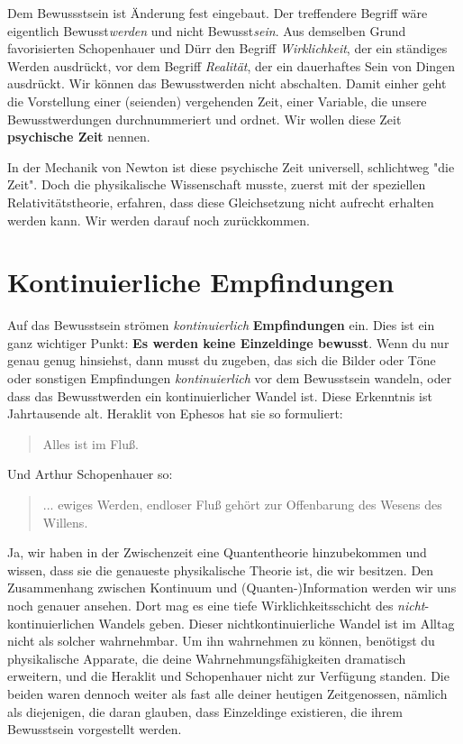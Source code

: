 \documentclass[12pt]{book}
\begin{document}
Dem Bewussstsein ist Änderung fest eingebaut. Der treffendere Begriff wäre eigentlich Bewusst\emph{werden} und nicht Bewusst\emph{sein}. Aus demselben Grund favorisierten Schopenhauer und Dürr den Begriff \emph{Wirklichkeit}, der ein ständiges Werden ausdrückt, vor dem Begriff \emph{Realität}, der ein dauerhaftes Sein von Dingen ausdrückt. Wir können das Bewusstwerden nicht abschalten. Damit einher geht die Vorstellung einer (seienden) vergehenden Zeit, einer Variable, die unsere Bewusstwerdungen durchnummeriert und ordnet. Wir wollen diese Zeit \textbf{psychische Zeit} nennen.

In der Mechanik von Newton ist diese psychische Zeit universell, schlichtweg "die Zeit". Doch die physikalische Wissenschaft musste, zuerst mit der speziellen Relativitätstheorie, erfahren, dass diese Gleichsetzung nicht aufrecht erhalten werden kann. Wir werden darauf noch zurückkommen.

\section{Kontinuierliche Empfindungen}

Auf das Bewusstsein strömen \emph{kontinuierlich} \textbf{Empfindungen} ein. Dies ist ein ganz wichtiger Punkt: \textbf{Es werden keine Einzeldinge bewusst}. Wenn du nur genau genug hinsiehst, dann musst du zugeben, das sich die Bilder oder Töne oder sonstigen Empfindungen \emph{kontinuierlich} vor dem Bewusstsein wandeln, oder dass das Bewusstwerden ein kontinuierlicher Wandel ist. Diese Erkenntnis ist Jahrtausende alt. Heraklit von Ephesos hat sie so formuliert:

\begin{quote}\begin{tcolorbox}
Alles ist im Fluß.
\end{tcolorbox}\end{quote}

Und Arthur Schopenhauer so:

\begin{quote}\begin{tcolorbox}
... ewiges Werden, endloser Fluß gehört zur Offenbarung des Wesens des Willens.
\end{tcolorbox}\end{quote}

Ja, wir haben in der Zwischenzeit eine Quantentheorie hinzubekommen und wissen, dass sie die genaueste physikalische Theorie ist, die wir besitzen. Den Zusammenhang zwischen Kontinuum und (Quanten-)Information werden wir uns noch genauer ansehen. Dort mag es eine tiefe Wirklichkeitsschicht des \emph{nicht}-kontinuierlichen Wandels geben. Dieser nichtkontinuierliche Wandel ist im Alltag nicht als solcher wahrnehmbar. Um ihn wahrnehmen zu können, benötigst du physikalische Apparate, die deine Wahrnehmungsfähigkeiten dramatisch erweitern, und die Heraklit und Schopenhauer nicht zur Verfügung standen. Die beiden waren dennoch weiter als fast alle deiner heutigen Zeitgenossen, nämlich als diejenigen, die daran glauben, dass Einzeldinge existieren, die ihrem Bewusstsein vorgestellt werden.
\end{document}
